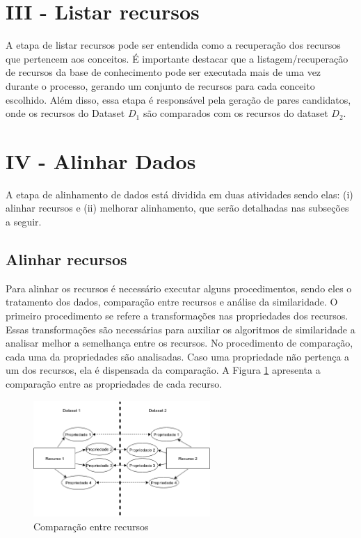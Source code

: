 \section*{III - Listar recursos}
A etapa de listar recursos pode ser entendida como a recuperação dos recursos que pertencem aos conceitos. É importante destacar que a listagem/recuperação de recursos da base de conhecimento pode ser executada mais de uma vez durante o processo, gerando um conjunto de recursos para cada conceito escolhido. Além disso, essa etapa é responsável pela geração de pares candidatos, onde os recursos do Dataset $D_{1}$ são comparados com os recursos do dataset $D_{2}$.


\section*{IV - Alinhar Dados}
A etapa de alinhamento de dados está dividida em duas atividades sendo elas: (i) alinhar recursos e (ii) melhorar alinhamento, que serão detalhadas nas subseções a seguir.

\subsection*{Alinhar recursos}
Para alinhar os recursos é necessário executar alguns procedimentos, sendo eles o tratamento dos dados, comparação entre recursos e análise da similaridade. O primeiro procedimento se refere a transformações nas propriedades dos recursos. Essas transformações são necessárias para auxiliar os algoritmos de similaridade a analisar melhor a semelhança entre os recursos. No procedimento de comparação, cada uma da propriedades são analisadas. Caso uma propriedade não pertença a um dos recursos, ela é dispensada da comparação. A Figura  \ref{fig:resources} apresenta a comparação entre as propriedades de cada recurso.

\begin{figure}[!ht]
	\centering
	\includegraphics[width=0.6\textwidth]{./imagens/resources.png}
    \caption{Comparação entre recursos}
	\label{fig:resources}
\end{figure}

